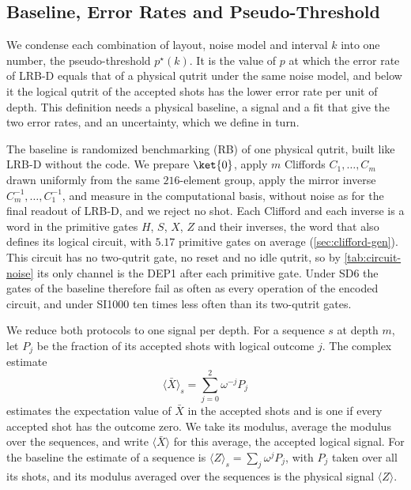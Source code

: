 \subsection{Baseline, Error Rates and Pseudo-Threshold}
\label{sub:fit_model}

We condense each combination of layout, noise model and interval $k$ into one number, the pseudo-threshold $p^\star(k)$. It is the value of $p$ at which the error rate of LRB-D equals that of a physical qutrit under the same noise model, and below it the logical qutrit of the accepted shots has the lower error rate per unit of depth. This definition needs a physical baseline, a signal and a fit that give the two error rates, and an uncertainty, which we define in turn.

\label{sub:rb_baseline}The baseline is randomized benchmarking (RB) of one physical qutrit, built like LRB-D without the code. We prepare $\ket{0}$, apply $m$ Cliffords $C_1, \dots, C_m$ drawn uniformly from the same $216$-element group, apply the mirror inverse $C_m^{-1}, \dots, C_1^{-1}$, and measure in the computational basis, without noise as for the final readout of LRB-D, and we reject no shot. Each Clifford and each inverse is a word in the primitive gates $H$, $S$, $X$, $Z$ and their inverses, the word that also defines its logical circuit, with $5.17$ primitive gates on average (\autoref{sec:clifford-gen}). This circuit has no two-qutrit gate, no reset and no idle qutrit, so by \autoref{tab:circuit-noise} its only channel is the DEP1 after each primitive gate. Under SD6 the gates of the baseline therefore fail as often as every operation of the encoded circuit, and under SI1000 ten times less often than its two-qutrit gates.

We reduce both protocols to one signal per depth. For a sequence $s$ at depth $m$, let $P_j$ be the fraction of its accepted shots with logical outcome $j$. The complex estimate
\begin{equation}
    \langle \bar{X} \rangle_s = \sum_{j=0}^{2} \omega^{-j} P_j
    \label{eq:estimator}
\end{equation}
estimates the expectation value of $\bar X$ in the accepted shots and is one if every accepted shot has the outcome zero. We take its modulus, average the modulus over the sequences, and write $\langle \bar{X} \rangle$ for this average, the accepted logical signal. For the baseline the estimate of a sequence is $\langle Z \rangle_s = \sum_j \omega^{j} P_j$, with $P_j$ taken over all its shots, and its modulus averaged over the sequences is the physical signal $\langle Z \rangle$.

